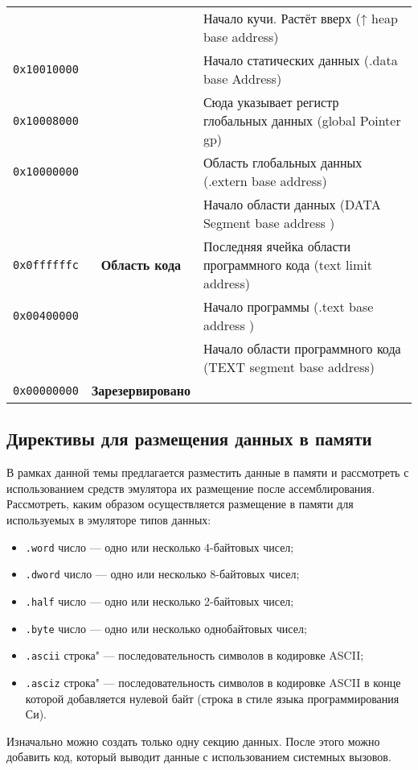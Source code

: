 \begin{table}[h]
\begin{tabularx}{\textwidth}{|c|c|X|}
        \hhline{~~-}
                            &  &  Начало кучи. Растёт вверх (↑ heap base address) \\
        \hhline{-~-}
        \texttt{0x10010000} &  &  Начало статических данных (.data base Address) \\
        \hhline{-~-}
        \texttt{0x10008000} &  &  Сюда указывает регистр глобальных данных (global Pointer gp) \\
        \hhline{-~-}
        \texttt{0x10000000} &  &  Область глобальных данных (.extern base address) \\
        \hhline{~~-}
                            &  &  Начало области данных  (DATA Segment base address ) \\
        \hline
        \texttt{0x0ffffffc} & \textbf{Область кода} &  Последняя ячейка области программного кода (text limit address) \\
        \hhline{-~-}
        \texttt{0x00400000} &  &  Начало программы (.text base address ) \\
        \hhline{~~-}
                            &  &  Начало области программного кода (TEXT segment base address) \\
        \hline
        \texttt{0x00000000} & \textbf{Зарезервировано} &   \\
        \hline
    \end{tabularx}
    \label{table-memory}
\end{table}

\subsection{Директивы для размещения данных в памяти}

В рамках данной темы предлагается разместить данные в памяти и рассмотреть с использованием средств эмулятора их размещение после ассемблирования. Рассмотреть, каким образом осуществляется размещение в памяти для используемых в эмуляторе типов данных:
\begin{itemize}
    \item \texttt{.word} число --- одно или несколько 4-байтовых чисел;
    \item \texttt{.dword} число --- одно или несколько 8-байтовых чисел;
    \item \texttt{.half} число --- одно или несколько 2-байтовых чисел;
    \item \texttt{.byte} число --- одно или несколько однобайтовых чисел;
    \item \texttt{.ascii} строка" --- последовательность символов в кодировке ASCII;
    \item \texttt{.asciz} строка" --- последовательность символов в кодировке ASCII в конце которой добавляется нулевой байт (строка в стиле языка программирования Си).
    \end{itemize}
Изначально можно создать только одну секцию данных. После этого можно добавить код, который выводит данные с использованием системных вызовов.

